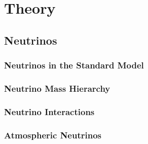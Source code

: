 \chapter{Theory}
\label{sec:theory}


\section{Neutrinos}
\label{sec:nus}


\subsection{Neutrinos in the Standard Model}
\label{sec:NusInSM}


\subsection{Neutrino Mass Hierarchy}
\label{sec:NMH}


\subsection{Neutrino Interactions}
\label{sec:NuInt}


\subsection{Atmospheric Neutrinos}
\label{sec:AtmNus}